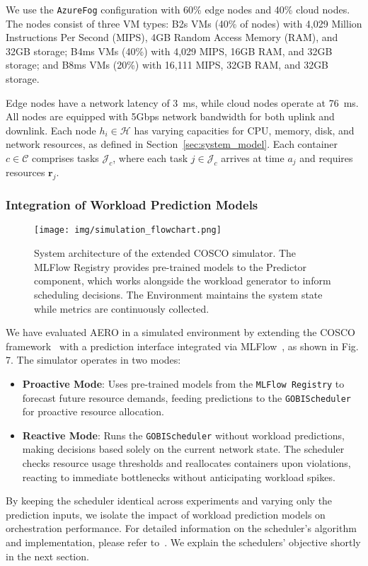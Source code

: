 \documentclass{ieeetmlcn}
\begin{document}
 We use the \texttt{AzureFog} configuration with 60\% edge nodes and 40\% cloud nodes. The nodes consist of three VM types: B2s VMs (40\% of nodes) with 4,029 Million Instructions Per Second (MIPS), 4GB Random Access Memory (RAM), and 32GB storage; B4ms VMs (40\%) with 4,029 MIPS, 16GB RAM, and 32GB storage; and B8ms VMs (20\%) with 16,111 MIPS, 32GB RAM, and 32GB storage.

Edge nodes have a network latency of \SI{3}{\milli\second}, while cloud nodes operate at \SI{76}{\milli\second}. All nodes are equipped with 5Gbps network bandwidth for both uplink and downlink. Each node $h_i \in \mathcal{H}$ has varying capacities for CPU, memory, disk, and network resources, as defined in Section~\ref{sec:system_model}. Each container $c \in \mathcal{C}$ comprises tasks $\mathcal{J}_c$, where each task $j \in \mathcal{J}_c$ arrives at time $a_j$ and requires resources $\mathbf{r}_j$.


\subsubsection{Integration of Workload Prediction Models}

\begin{figure}\centering
\centering
\centering\texttt{[image: img/simulation\_flowchart.png]}
\caption{System architecture of the extended COSCO simulator. The MLFlow Registry provides pre-trained models to the Predictor component, which works alongside the workload generator to inform scheduling decisions. The Environment maintains the system state while metrics are continuously collected.}
\label{fig:simulation_flowchart}
\end{figure}

{\color{blue}
We have evaluated AERO in a simulated environment by extending the COSCO framework~\cite{tuli2021cosco} with a prediction interface integrated via MLFlow~\cite{MLFlow}, as shown in Fig. 7. The simulator operates in two modes:
\begin{itemize}
    \item \textbf{Proactive Mode}: Uses pre-trained models from the \texttt{MLFlow Registry} to forecast future resource demands, feeding predictions to the \texttt{GOBIScheduler} for proactive resource allocation.
    \item \textbf{Reactive Mode}: Runs the \texttt{GOBIScheduler} without workload predictions, making decisions based solely on the current network state. The scheduler checks resource usage thresholds and reallocates containers upon violations, reacting to immediate bottlenecks without anticipating workload spikes.
\end{itemize}

By keeping the scheduler identical across experiments and varying only the prediction inputs, we isolate the impact of workload prediction models on orchestration performance. For detailed information on the scheduler's algorithm and implementation, please refer to~\cite{tuli2021cosco}. We explain the schedulers' objective shortly in the next section.
}
\end{document}
